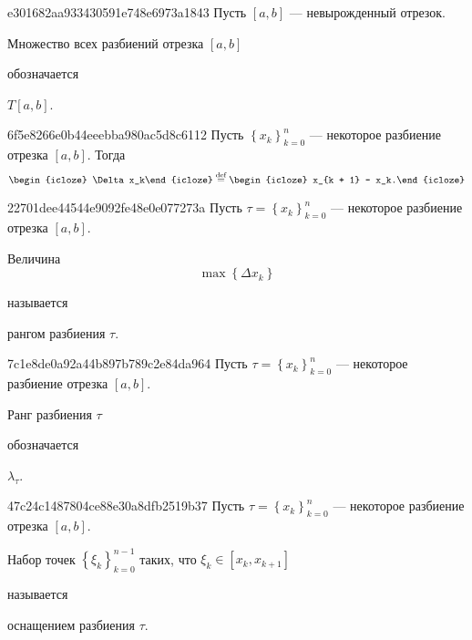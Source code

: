 \begin{note}{e301682aa933430591e748e6973a1843}
    Пусть \({ [a, b] }\) --- невырожденный отрезок.
    \begin{icloze}{1}Множество всех разбиений отрезка \({ [a, b] }\)\end{icloze} обозначается \begin{icloze}{2}\({ T[a, b] }\).\end{icloze}
\end{note}

\begin{note}{6f5e8266e0b44eeebba980ac5d8c6112}
    Пусть \( \left\{ x_k \right\}_{k = 0}^{n} \) --- некоторое разбиение отрезка \( [a, b] \).
    Тогда
    \[
        \begin{icloze}{2}\Delta x_k\end{icloze} \overset{\text{def}}= \begin{icloze}{1}x_{k + 1} - x_k.\end{icloze}
    \]
\end{note}

\begin{note}{22701dee44544e9092fe48e0e077273a}
    Пусть \( \tau = \left\{ x_k \right\}_{k = 0}^{n} \) --- некоторое разбиение отрезка \( [a, b] \).
    \begin{icloze}{1}Величина
    \[
        \max \left\{ \Delta x_k \right\}
    \]\end{icloze}
    называется \begin{icloze}{2}рангом разбиения \( \tau \).\end{icloze}
\end{note}

\begin{note}{7c1e8de0a92a44b897b789c2e84da964}
    Пусть \( \tau = \left\{ x_k \right\}_{k = 0}^{n} \) --- некоторое разбиение отрезка \( [a, b] \).
    \begin{icloze}{2}Ранг разбиения \( \tau \)\end{icloze} обозначается \begin{icloze}{1}\( \lambda_\tau \).\end{icloze}
\end{note}

\begin{note}{47c24c1487804ce88e30a8dfb2519b37}
    Пусть \( \tau = \left\{ x_k \right\}_{k = 0}^{n} \) --- некоторое разбиение отрезка \( [a, b] \).
    \begin{icloze}{1}Набор точек \( \left\{ \xi_k \right\}_{k = 0}^{n - 1} \) таких, что \( \xi_k \in [x_k, x_{k + 1}] \)\end{icloze} называется \begin{icloze}{2}оснащением разбиения \( \tau \).\end{icloze}
\end{note}

